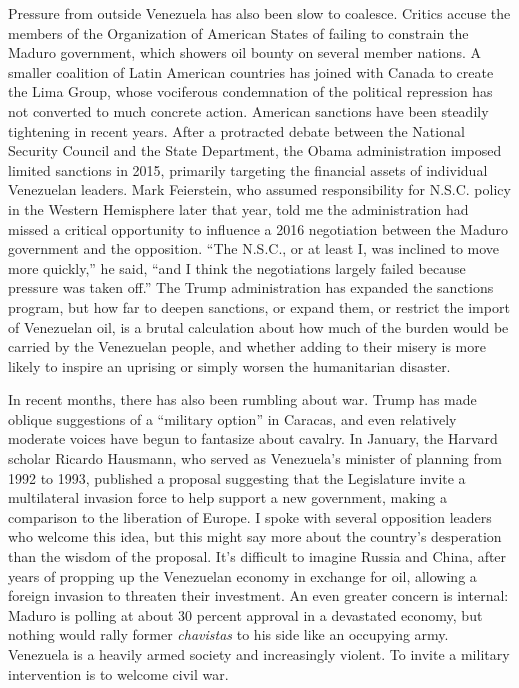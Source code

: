 Pressure from outside Venezuela has also been slow to coalesce. Critics
accuse the members of the Organization of American States of failing to
constrain the Maduro government, which showers oil bounty on several
member nations. A smaller coalition of Latin American countries has
joined with Canada to create the Lima Group, whose vociferous
condemnation of the political repression has not converted to much
concrete action. American sanctions have been steadily tightening in
recent years. After a protracted debate between the National Security
Council and the State Department, the Obama administration imposed
limited sanctions in 2015, primarily targeting the financial assets of
individual Venezuelan leaders. Mark Feierstein, who assumed
responsibility for N.S.C. policy in the Western Hemisphere later that
year, told me the administration had missed a critical opportunity to
influence a 2016 negotiation between the Maduro government and the
opposition. ``The N.S.C., or at least I, was inclined to move more
quickly,'' he said, ``and I think the negotiations largely failed
because pressure was taken off.'' The Trump administration has expanded
the sanctions program, but how far to deepen sanctions, or expand them,
or restrict the import of Venezuelan oil, is a brutal calculation about
how much of the burden would be carried by the Venezuelan people, and
whether adding to their misery is more likely to inspire an uprising or
simply worsen the humanitarian disaster.

In recent months, there has also been rumbling about war. Trump has made
oblique suggestions of a ``military option'' in Caracas, and even
relatively moderate voices have begun to fantasize about cavalry. In
January, the Harvard scholar Ricardo Hausmann, who served as Venezuela's
minister of planning from 1992 to 1993, published a proposal suggesting
that the Legislature invite a multilateral invasion force to help
support a new government, making a comparison to the liberation of
Europe. I spoke with several opposition leaders who welcome this idea,
but this might say more about the country's desperation than the wisdom
of the proposal. It's difficult to imagine Russia and China, after years
of propping up the Venezuelan economy in exchange for oil, allowing a
foreign invasion to threaten their investment. An even greater concern
is internal: Maduro is polling at about 30 percent approval in a
devastated economy, but nothing would rally former \emph{chavistas} to
his side like an occupying army. Venezuela is a heavily armed society
and increasingly violent. To invite a military intervention is to
welcome civil war.

